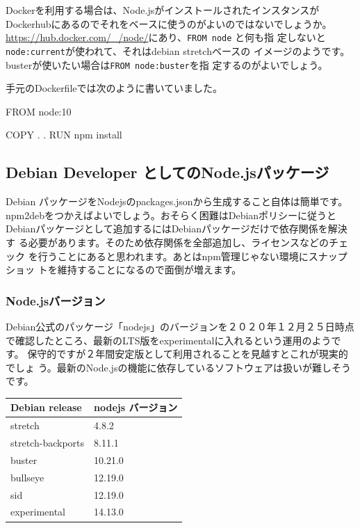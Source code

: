 \documentclass[mingoth,a4paper]{jsarticle}
\begin{document}
Dockerを利用する場合は、Node.jsがインストールされたインスタンスが
Dockerhubにあるのでそれをベースに使うのがよいのではないでしょうか。
\url{https://hub.docker.com/_/node/}にあり、\texttt{FROM node} と何も指
定しないと\texttt{node:current}が使われて、それはdebian stretchベースの
イメージのようです。busterが使いたい場合は\texttt{FROM node:buster}を指
定するのがよいでしょう。

手元のDockerfileでは次のように書いていました。

\begin{commandline}
FROM node:10

COPY . .
RUN npm install
\end{commandline}

\subsection{Debian Developer としてのNode.jsパッケージ}

Debian パッケージをNodejsのpackages.jsonから生成すること自体は簡単です。
npm2debをつかえばよいでしょう。おそらく困難はDebianポリシーに従うと
Debianパッケージとして追加するにはDebianパッケージだけで依存関係を解決す
る必要があります。そのため依存関係を全部追加し、ライセンスなどのチェック
を行うことにあると思われます。あとはnpm管理じゃない環境にスナップショッ
トを維持することになるので面倒が増えます。

\subsubsection{Node.jsバージョン}

Debian公式のパッケージ「nodejs」のバージョンを２０２０年１２月２５日時点
で確認したところ、最新のLTS版をexperimentalに入れるという運用のようです。
保守的ですが２年間安定版として利用されることを見越すとこれが現実的でしょ
う。最新のNode.jsの機能に依存しているソフトウェアは扱いが難しそうです。

\begin{tabular}{|l|l|}
Debian release    & nodejs バージョン \\
\hline
stretch           & 4.8.2 \\
stretch-backports & 8.11.1 \\
buster            & 10.21.0 \\
bullseye          & 12.19.0 \\
sid               & 12.19.0 \\
experimental      & 14.13.0 \\
\end{tabular}
\end{document}
